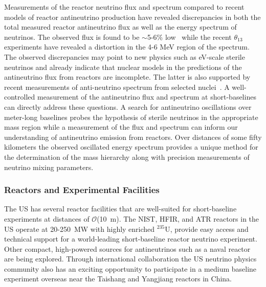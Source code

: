 Measurements of the reactor neutrino flux and spectrum compared to
recent models of reactor antineutrino production have revealed
discrepancies in both the total measured reactor antineutrino flux as
well as the energy spectrum of neutrinos. The observed flux is found
to be $\sim$5-6\% low~\cite{Mention:2011rk, Zhang:2013ela} while the
recent $\theta_{13}$ experiments have revealed a distortion in the 4-6
MeV region of the spectrum.  The observed discrepancies may point to
new physics such as eV-scale sterile neutrinos and already indicate
that nuclear models in the predictions of the antineutrino flux from
reactors are incomplete. The latter is also supported by
recent measurements of anti-neutrino spectrum from selected nuclei~\cite{MTAS}. A well-controlled measurement of the
antineutrino flux and spectrum at short-baselines can directly address
these questions. A search for antineutrino oscillations over
meter-long baselines probes the hypothesis of sterile neutrinos in the
appropriate mass region while a measurement of the flux and spectrum
can inform our understanding of antineutrino emission from reactors.
Over distances of some fifty kilometers the observed oscillated energy
spectrum provides a unique method for the determination of the mass
hierarchy along with precision measurements of neutrino mixing
parameters.

\subsubsection{Reactors and Experimental Facilities}
The US has several reactor facilities that are well-suited for
short-baseline experiments at distances of $\mathcal{O}$(10~m). The
NIST, HFIR, and ATR reactors in the US operate at 20-250~MW with
highly enriched $^{235}$U, provide easy access and technical support
for a world-leading short-baseline reactor neutrino experiment. Other
compact, high-powered sources for antineutrinos such as a naval
reactor are being explored. Through international collaboration the US
neutrino physics community also has an exciting opportunity to
participate in a medium baseline experiment overseas near the Taishang
and Yangjiang reactors in China.


